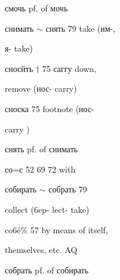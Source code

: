 \begin{minipage}[t]{0.475\textwidth}
\noindent смочь pf. of мочь\par
\noindent снимать $\sim$ снять 79 take (им-,\par
\noindent я- take)\par
\noindent сносйть $\dagger$ 75 саггу down,\par
\noindent remove (нос- carry)\par
\noindent сноска 75 footnote (нос-\par
\noindent carry )\par
\noindent снять pf. of снимать\par
\noindent со=с 52 69 72 with\par
\noindent собирать $\sim$ собрать 79\par
\noindent collect (6ep- lect- take)\par
\noindent co6é\% 57 by means of itself,\par
\noindent themselves, etc. AQ\par
\noindent собрать pf. of собирать\par
\end{minipage}\hfill
